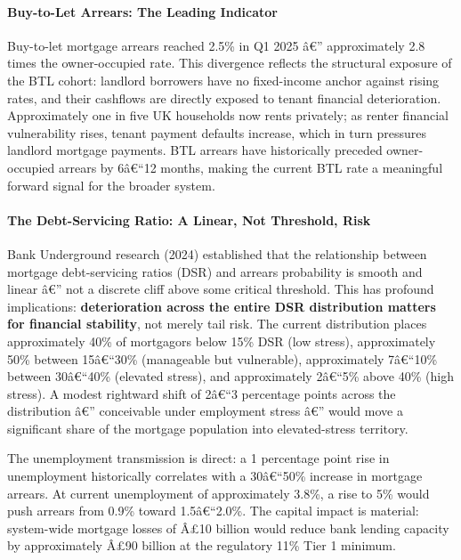 \paragraph{Buy-to-Let Arrears: The Leading
Indicator}\label{buy-to-let-arrears-the-leading-indicator}

Buy-to-let mortgage arrears reached 2.5\% in Q1 2025 â€'' approximately
2.8 times the owner-occupied rate. This divergence reflects the
structural exposure of the BTL cohort: landlord borrowers have no
fixed-income anchor against rising rates, and their cashflows are
directly exposed to tenant financial deterioration. Approximately one in
five UK households now rents privately; as renter financial
vulnerability rises, tenant payment defaults increase, which in turn
pressures landlord mortgage payments. BTL arrears have historically
preceded owner-occupied arrears by 6â€``12 months, making the current
BTL rate a meaningful forward signal for the broader system.

\paragraph{The Debt-Servicing Ratio: A Linear, Not Threshold,
Risk}\label{the-debt-servicing-ratio-a-linear-not-threshold-risk}

Bank Underground research (2024) established that the relationship
between mortgage debt-servicing ratios (DSR) and arrears probability is
smooth and linear â€'' not a discrete cliff above some critical
threshold. This has profound implications: \textbf{deterioration across
the entire DSR distribution matters for financial stability}, not merely
tail risk. The current distribution places approximately 40\% of
mortgagors below 15\% DSR (low stress), approximately 50\% between
15â€``30\% (manageable but vulnerable), approximately 7â€``10\% between
30â€``40\% (elevated stress), and approximately 2â€``5\% above 40\%
(high stress). A modest rightward shift of 2â€``3 percentage points
across the distribution â€'' conceivable under employment stress â€''
would move a significant share of the mortgage population into
elevated-stress territory.

The unemployment transmission is direct: a 1 percentage point rise in
unemployment historically correlates with a 30â€``50\% increase in
mortgage arrears. At current unemployment of approximately 3.8\%, a rise
to 5\% would push arrears from 0.9\% toward 1.5â€``2.0\%. The capital
impact is material: system-wide mortgage losses of Â£10 billion would
reduce bank lending capacity by approximately Â£90 billion at the
regulatory 11\% Tier 1 minimum.

